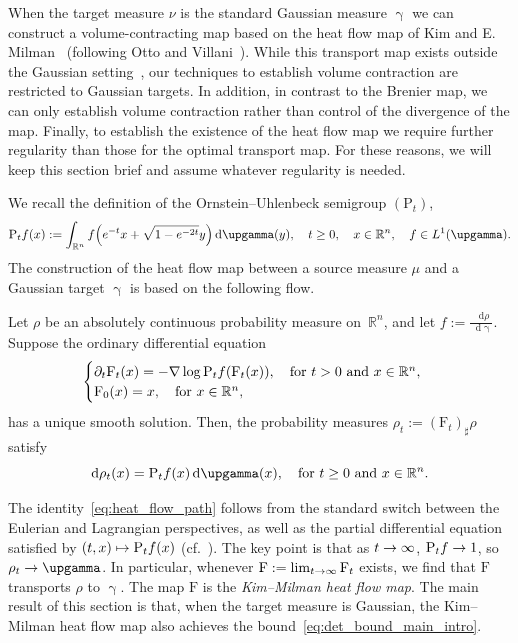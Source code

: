 \documentclass[AHL,Unicode,longabstracts]{cedram}
\newcommand{\R}{\mathbb R}
\newcommand{\Pheat}{\mathrm{P}}
\newcommand{\KM}{\mathrm F}
\newcommand{\dd}{n}
\newcommand{\density}{f}
\newcommand{\prob}{\rho}
\newcommand{\source}{\mu}
\newcommand{\target}{\nu}
\newcommand*\diff{\mathop{}\!\mathrm{d}}
\newcommand{\Gaussian}{\upgamma}
\renewcommand*{\to}{\mathchoice{\longrightarrow}{\rightarrow}{\rightarrow}{\rightarrow}}
\let\oldmapsto\mapsto
\renewcommand*{\mapsto}{\mathchoice{\longmapsto}{\oldmapsto}{\oldmapsto}{\oldmapsto}}
\let\originalleft\left
\let\originalright\right
\renewcommand{\left}{\mathopen{}\mathclose\bgroup\originalleft}
\renewcommand{\right}{\aftergroup\egroup\originalright}
\let\oldin\in
\renewcommand{\in}{\mathchoice{\oldin}{\oldin}{\,\oldin\,}{\,\oldin\,}}
\begin{document}
When the target measure $\target$ is the standard Gaussian measure $\Gaussian$ we can construct a volume-contracting map based on the heat flow map of Kim and E. Milman~\cite{MR2983070} (following Otto and Villani~\cite{MR1760620}). While this transport map exists outside the Gaussian setting~\cite{MR2983070,MR4707029}, our techniques to establish volume contraction are restricted to Gaussian targets. In addition, in contrast to the Brenier map, we can only establish volume contraction rather than control of the divergence of the map. Finally, to establish the existence of the heat flow map we require further regularity than those for the optimal transport map. For these reasons, we will keep this section brief and assume whatever regularity is needed.

We recall the definition of the Ornstein--Uhlenbeck semigroup $(\Pheat_t)$,
\begin{equation}\label{eq:OU_def}
\Pheat_t\density(x):=\int_{\R^{\dd}} \density\left(e^{-t}x+\sqrt{1-e^{-2t}}y\right)\diff \Gaussian(y),\quad t\ge 0,\quad x\in \R^{\dd}, \quad \density \in L^1(\Gaussian).
\end{equation}
The construction of the heat flow map between a source measure $\source$ and a Gaussian target $\Gaussian$ is based on the following flow.
\begin{prop}\label{prop:KM_construction}
Let $\prob$ be an absolutely continuous probability measure on~$\R^{\dd}$, and let $\density:=\frac{\diff\prob}{\diff\Gaussian}$. Suppose the ordinary differential equation
\begin{equation}\label{eq:KM_construction}
\begin{cases}
\partial_t\KM_t(x)=-\nabla\log\Pheat_t\density(\KM_t(x)),\quad \text{for}~t>0 \text{ and } x\in \R^{\dd}, \\
\KM_0(x)=x,\quad \text{for}~x\in \R^{\dd},
\end{cases}
\end{equation}
has a unique smooth solution. Then, the probability measures $\prob_t:=(\KM_t)_{\sharp}\prob$ satisfy
\begin{equation}\label{eq:heat_flow_path}
\diff\prob_t(x)=\Pheat_t \density(x)\diff\Gaussian(x),\quad\text{for } t\ge 0 \text{ and } x\in \R^{\dd}.
\end{equation}
\end{prop}

The identity~\eqref{eq:heat_flow_path} follows from the standard switch between the Eulerian and Lagrangian perspectives, as well as the partial differential equation satisfied by $(t,x)\mapsto \Pheat_t \density(x)$ (cf.~\cite[\S 1.2]{MR2983070}). The key point is that as $t\to\infty$, $\Pheat_t \density\to 1$, so $\prob_t\to \Gaussian$. In particular, whenever $\KM:=\lim_{t\to\infty}\KM_t$ exists, we find that $\KM$ transports $\prob$ to $\Gaussian$. The map $\KM$ is the \emph{Kim--Milman heat flow map}. The main result of this section is that, when the target measure is Gaussian, the Kim--Milman heat flow map also achieves the bound~\eqref{eq:det_bound_main_intro}.
\end{document}
